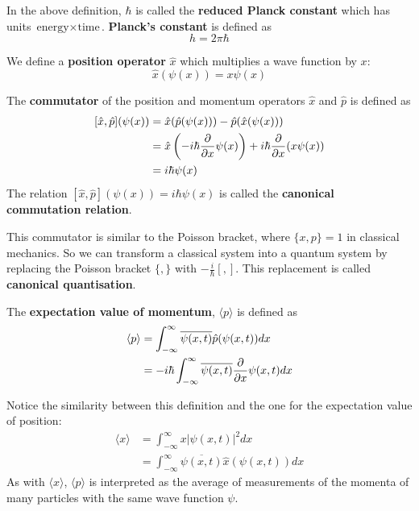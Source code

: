 \begin{definition}
	In the above definition, $\hbar$ is called the \textbf{reduced Planck constant} which has units $\text{energy} \times \text{time}$. \textbf{Planck's constant} is defined as
	\[
		h = 2 \pi \hbar
	\]
\end{definition}

\begin{definition}
	We define a \textbf{position operator} $\hat{x}$ which multiplies a wave function by $x$:
	\[
		\hat{x} (\psi(x)) = x \psi(x)
	\]
\end{definition}

\begin{definition}
	The \textbf{commutator} of the position and momentum operators $\hat{x}$ and $\hat{p}$ is defined as
	\[
		\begin{aligned}
			\relax [\hat{x}, \hat{p}] (\psi(x))
				& = \hat{x} (\hat{p} (\psi(x))) - \hat{p} (\hat{x} (\psi(x))) \\
				& = \hat{x} \left( -i \hbar \diffp{}{x} \psi(x) \right)	+ i \hbar \diffp{}{x} (x \psi(x)) \\
				& = i \hbar \psi(x)
		\end{aligned}
	\]
	The relation $[\hat{x}, \hat{p}] (\psi(x)) = i \hbar \psi(x)$ is called the \textbf{canonical commutation relation}.
\end{definition}

\begin{remark}
	This commutator is similar to the Poisson bracket, where $\{ x, p \} = 1$ in classical mechanics. So we can transform a classical system into a quantum system by replacing the Poisson bracket $\{ , \}$ with $-\frac{i}{\hbar} [,]$. This replacement is called \textbf{canonical quantisation}.
\end{remark}

\begin{definition}
	The \textbf{expectation value of momentum}, $\langle p \rangle$ is defined as
	\[
		\begin{aligned}
			\langle p \rangle
				& = \int_{-\infty}^{\infty} \overline{\psi(x, t)} \hat{p} (\psi(x, t)) dx \\
				& = -i \hbar \int_{-\infty}^{\infty} \overline{\psi(x, t)} \diffp{}{x} \psi(x, t) dx
		\end{aligned}
	\]
\end{definition}

\begin{remark}
	Notice the similarity between this definition and the one for the expectation value of position:
	\[
		\begin{aligned}
			\langle x \rangle
				& = \int_{-\infty}^{\infty} x |\psi(x, t)|^2 dx \\
				& = \int_{-\infty}^{\infty} \overline{\psi(x, t)} \hat{x} (\psi(x, t)) dx
		\end{aligned}
	\]
	As with $\langle x \rangle$, $\langle p \rangle$ is interpreted as the average of measurements of the momenta of many particles with the same wave function $\psi$.
\end{remark}

